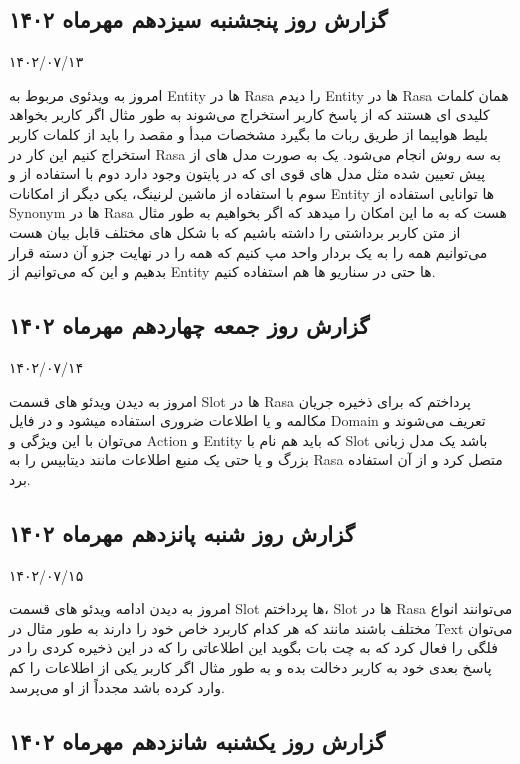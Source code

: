 \subsection{گزارش روز پنجشنبه سیزدهم مهرماه ۱۴۰۲}

۱۴۰۲/۰۷/۱۳

امروز به ویدئوی مربوط به Entity ها در Rasa را دیدم Entity ها در Rasa همان کلمات کلیدی ای هستند که از پاسخ کاربر استخراج می‌شوند
به طور مثال اگر کاربر بخواهد بلیط هواپیما از طریق ربات ما بگیرد مشخصات مبدأ و مقصد را باید از کلمات کاربر استخراج کنیم این کار در Rasa به سه روش انجام می‌شود. یک به صورت مدل های از پیش تعیین شده مثل مدل های قوی ای که در پایتون وجود دارد دوم با استفاده از  و سوم با استفاده از ماشین لرنینگ، یکی دیگر از امکانات Entity ها توانایی استفاده از Synonym ها در Rasa هست که به ما این امکان را میدهد که اگر بخواهیم به طور مثال از متن کاربر برداشتی را داشته باشیم که با شکل های مختلف قابل بیان هست می‌توانیم همه را به یک بردار واحد مپ کنیم که همه را در نهایت جزو آن دسته قرار بدهیم
و این که می‌توانیم از Entity ها حتی در سناریو ها هم استفاده کنیم.


\subsection{گزارش روز جمعه چهاردهم مهرماه ۱۴۰۲}

۱۴۰۲/۰۷/۱۴

امروز به دیدن ویدئو های قسمت Slot ها در Rasa پرداختم که برای ذخیره جریان مکالمه و یا اطلاعات ضروری استفاده میشود و در فایل Domain تعریف می‌شوند و می‌توان با این ویژگی و Action و Entity که باید هم نام با Slot باشد یک مدل زبانی بزرگ و یا حتی یک منبع اطلاعات مانند دیتابیس را به Rasa متصل کرد و از آن استفاده برد.


\subsection{گزارش روز شنبه پانزدهم مهرماه ۱۴۰۲}

۱۴۰۲/۰۷/۱۵

امروز به دیدن ادامه ویدئو های قسمت Slot ها پرداختم، Slot ها در Rasa می‌توانند انواع مختلف باشند مانند  که هر کدام کاربرد خاص خود را دارند به طور مثال در Text می‌توان فلگی را فعال کرد که به چت بات بگوید این اطلاعاتی را که در این  ذخیره کردی را در پاسخ بعدی خود به کاربر دخالت بده و به طور مثال اگر کاربر یکی از اطلاعات را کم وارد کرده باشد مجدداً از او می‌پرسد.


\subsection{گزارش روز یکشنبه شانزدهم مهرماه ۱۴۰۲}

